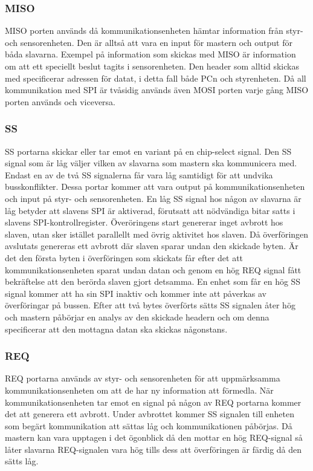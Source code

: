 \subsubsection{MISO}
MISO porten används då kommunikationsenheten hämtar information från styr- och sensorenheten. Den är alltså att vara en input för mastern och output för båda slavarna. Exempel på information som skickas med MISO är information om att ett speciellt beslut tagits i sensorenheten. Den header som alltid skickas med specificerar adressen för datat, i detta fall både PCn och styrenheten.
Då all kommunikation med SPI är tvåsidig används även MOSI porten varje gång MISO porten används och viceversa.

\subsubsection{SS}
SS portarna skickar eller tar emot en variant på en chip-select signal. Den SS signal som är låg väljer vilken av slavarna som mastern ska kommunicera med. Endast en av de två SS signalerna får vara låg samtidigt för att undvika busskonflikter. Dessa portar kommer att vara output på kommunikationsenheten och input på styr- och sensorenheten.
En låg SS signal hos någon av slavarna är låg betyder att slavens SPI är aktiverad, förutsatt att nödvändiga bitar satts i slavens SPI-kontrollregister. Överöringens start genererar inget avbrott hos slaven, utan sker istället parallellt med övrig aktivitet hos slaven. Då överföringen avslutats genereras ett avbrott där slaven sparar undan den skickade byten. Är det den första byten i överföringen som skickats får efter det att kommunikationsenheten sparat undan datan och genom en hög REQ signal fått bekräftelse att den berörda slaven gjort detsamma. En enhet som får en hög SS signal kommer att ha sin SPI inaktiv och kommer inte att påverkas av överföringar på bussen.
Efter att två bytes överförts sätts SS signalen åter hög och mastern påbörjar en analys av den skickade headern och om denna specificerar att den mottagna datan ska skickas någonstans.

\subsubsection{REQ}
REQ portarna används av styr- och sensorenheten för att uppmärksamma kommunikationsenheten om att de har ny information att förmedla. När kommunikationsenheten tar emot en signal på någon av REQ portarna kommer det att generera ett avbrott. Under avbrottet kommer SS signalen till enheten som begärt kommunikation att sättas låg och kommunikationen påbörjas. Då mastern kan vara upptagen i det ögonblick då den mottar en hög REQ-signal så låter slavarna REQ-signalen vara hög tills dess att överföringen är färdig då den sätts låg. 

